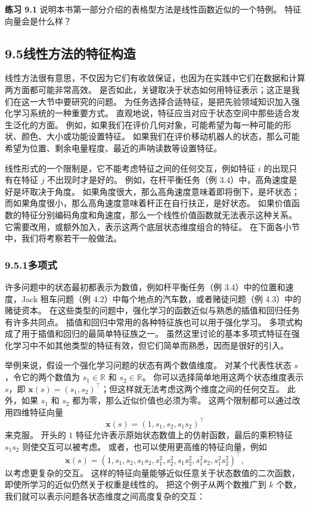 \documentclass[UTF8, 12pt, fontset=fandol, oneside]{ctexart}
\begin{document}
\noindent\textbf{练习 9.1}
说明本书第一部分介绍的表格型方法是线性函数近似的一个特例。
特征向量会是什么样？

\subsection*{9.5\quad 线性方法的特征构造}

线性方法很有意思，不仅因为它们有收敛保证，也因为在实践中它们在数据和计算两方面都可能非常高效。
是否如此，关键取决于状态如何用特征表示；这正是我们在这一大节中要研究的问题。
为任务选择合适特征，是把先验领域知识加入强化学习系统的一种重要方式。
直观地说，特征应当对应于状态空间中那些适合发生泛化的方面。
例如，如果我们在评价几何对象，可能希望为每一种可能的形状、颜色、大小或功能设置特征。
如果我们在评价移动机器人的状态，那么可能希望为位置、剩余电量程度、最近的声呐读数等设置特征。

线性形式的一个限制是，它不能考虑特征之间的任何交互，例如特征 $i$ 的出现只有在特征 $j$ 不出现时才是好的。
例如，在杆平衡任务（例 3.4）中，高角速度是好是坏取决于角度。
如果角度很大，那么高角速度意味着即将倒下，是坏状态；而如果角度很小，那么高角速度意味着杆正在自行扶正，是好状态。
如果价值函数的特征分别编码角度和角速度，那么一个线性价值函数就无法表示这种关系。
它需要改用，或额外加入，表示这两个底层状态维度组合的特征。
在下面各小节中，我们将考察若干一般做法。

\subsubsection*{9.5.1\quad 多项式}

许多问题中的状态最初都表示为数值，例如杆平衡任务（例 3.4）中的位置和速度，Jack 租车问题（例 4.2）中每个地点的汽车数，或者赌徒问题（例 4.3）中的赌徒资本。
在这些类型的问题中，强化学习的函数近似与熟悉的插值和回归任务有许多共同点。
插值和回归中常用的各种特征族也可以用于强化学习。
多项式构成了用于插值和回归的最简单特征族之一。
虽然这里讨论的基本多项式特征在强化学习中不如其他类型的特征有效，但它们简单而熟悉，因而是很好的引入。

举例来说，假设一个强化学习问题的状态有两个数值维度。
对某个代表性状态 $s$，令它的两个数值为 $s_1\in\mathbb{R}$ 和 $s_2\in\mathbb{R}$。
你可以选择简单地用这两个状态维度表示 $s$，即 $\mathbf{x}(s)=(s_1,s_2)^\top$；但这样就无法考虑这两个维度之间的任何交互。
此外，如果 $s_1$ 和 $s_2$ 都为零，那么近似价值也必须为零。
这两个限制都可以通过改用四维特征向量
\[
\mathbf{x}(s)=(1,s_1,s_2,s_1s_2)^\top
\]
来克服。
开头的 $1$ 特征允许表示原始状态数值上的仿射函数，最后的乘积特征 $s_1s_2$ 则使交互可以被考虑。
或者，也可以使用更高维的特征向量，例如
\[
\mathbf{x}(s)=(1,s_1,s_2,s_1s_2,s_1^2,s_2^2,s_1s_2^2,s_1^2s_2,s_1^2s_2^2)^\top,
\]
以考虑更复杂的交互。
这样的特征向量能够近似任意关于状态数值的二次函数，即使所学习的近似仍然关于权重是线性的。
把这个例子从两个数推广到 $k$ 个数，我们就可以表示问题各状态维度之间高度复杂的交互：
\end{document}
